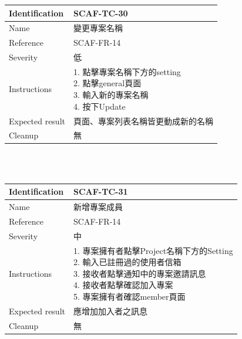 \documentclass{report}
\begin{document}
\begin{tabularx}{\textwidth}{
  |p{}%
  |p{}|%
  }
  \hline
  \centering Identification &  SCAF-TC-30 \\
  \hline
  \centering Name & 變更專案名稱 \\
  \hline
  \centering Reference & SCAF-FR-14 \\
  \hline
  \centering Severity & 低 \\
  \hline
  \centering Instructions & 
  \makecell[l]{
    1. 點擊專案名稱下方的setting \\
    2. 點擊general頁面 \\
    3. 輸入新的專案名稱 \\
    4. 按下Update 
  }\\
  \hline
  \centering Expected result & 頁面、專案列表名稱皆更動成新的名稱 \\
  \hline
  \centering Cleanup & 無 \\
  \hline
\end{tabularx}
\\
\newline
\\
\begin{tabularx}{\textwidth}{
  |p{}%
  |p{}|%
  }
  \hline
  \centering Identification &  SCAF-TC-31 \\
  \hline
  \centering Name & 新增專案成員 \\
  \hline
  \centering Reference & SCAF-FR-14 \\
  \hline
  \centering Severity & 中 \\
  \hline
  \centering Instructions & 
  \makecell[l]{
    1. 專案擁有者點擊Project名稱下方的Setting \\
    2. 輸入已註冊過的使用者信箱 \\
    3. 接收者點擊通知中的專案邀請訊息 \\
    4. 接收者點擊確認加入專案 \\
    5. 專案擁有者確認member頁面
  }\\
  \hline
  \centering Expected result & 應增加加入者之訊息 \\
  \hline
  \centering Cleanup & 無 \\
  \hline
\end{tabularx}
\\
\newline
\end{document}
